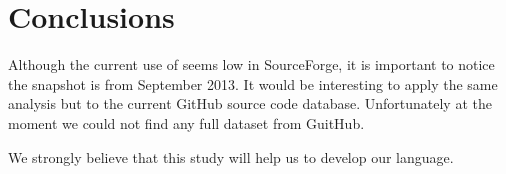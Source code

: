 
\section{Conclusions} \label{sec:conclusions}

Although the current use of \smu{} seems low in SourceForge, it is important to notice the snapshot is from September 2013.
It would be interesting to apply the same analysis but to the current GitHub source code database.
Unfortunately at the moment we could not find any full dataset from GuitHub.

We strongly believe that this study will help us to develop our language.